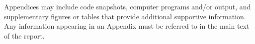 Appendices may include code snapshots, computer programs and/or output, and supplementary figures or tables that provide additional supportive information. Any information appearing in an Appendix must be referred to in the main text of the report.
